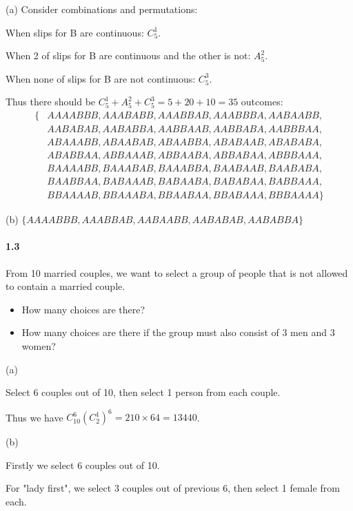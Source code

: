 \solution
(a) Consider combinations and permutations:

When slips for B are continuous: $C_{5}^{1}$.

When 2 of slips for B are continuous and the other is not: $A_{5}^{2}$.

When none of slips for B are not continuous: $C_{5}^{3}$.

Thus there should be $C_{5}^{1}+A_{5}^{2}+C_{5}^{3} = 5+20+10 = 35$ outcomes:
\begin{equation*}
    \begin{split}
      \{& AAAABBB, AAABABB, AAABBAB, AAABBBA, AABAABB,\\
        & AABABAB, AABABBA, AABBAAB, AABBABA, AABBBAA,\\
        & ABAAABB, ABAABAB, ABAABBA, ABABAAB, ABABABA,\\
        & ABABBAA, ABBAAAB, ABBAABA, ABBABAA, ABBBAAA,\\
        & BAAAABB, BAAABAB, BAAABBA, BAABAAB, BAABABA,\\
        & BAABBAA, BABAAAB, BABAABA, BABABAA, BABBAAA,\\
        & BBAAAAB, BBAAABA, BBAABAA, BBABAAA, BBBAAAA\}
    \end{split}
\end{equation*}

(b)
$\{AAAABBB, AAABBAB, AABAABB, AABABAB, AABABBA\}$

\paragraph{1.3}
From 10 married couples, we want to select a group of people that is not allowed to contain a married couple.
\begin{itemize}
    \item[(a)] How many choices are there?
    \item[(b)] How many choices are there if the group must also consist of 3 men and 3 women?
\end{itemize}

\solution
(a)

Select 6 couples out of 10, then select 1 person from each couple.

Thus we have $C_{10}^6 {(C_{2}^1)}^6 = 210 \times 64 = 13440$.

(b)

Firstly we select 6 couples out of 10.

For "lady first", we select 3 couples out of previous 6, then select 1 female from each.

